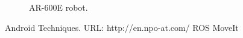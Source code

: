 \documentclass[letterpaper, 10 pt, conference]{ieeeconf}  %
\begin{document}
\begin{figure} [thpb]
      \centering
      \caption{AR-600E robot.}
      \label{img:ar600e}
\end{figure}

\addtolength{\textheight}{-12cm}   %









\begin{thebibliography}{99}

 Android Techniques. URL: http://en.npo-at.com/
 ROS
 MoveIt


\end{thebibliography}
\end{document}
